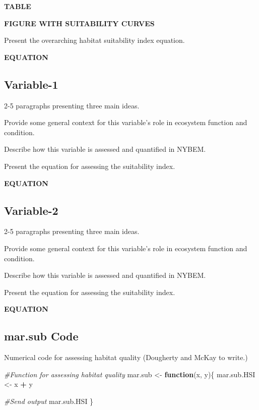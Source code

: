 \documentclass[
]{book}
\newenvironment{Shaded}{\begin{snugshade}}{\end{snugshade}}
\newcommand{\CommentTok}[1]{\textcolor[rgb]{0.56,0.35,0.01}{\textit{#1}}}
\newcommand{\ControlFlowTok}[1]{\textcolor[rgb]{0.13,0.29,0.53}{\textbf{#1}}}
\newcommand{\NormalTok}[1]{#1}
\newcommand{\OperatorTok}[1]{\textcolor[rgb]{0.81,0.36,0.00}{\textbf{#1}}}
\newcommand{\StringTok}[1]{\textcolor[rgb]{0.31,0.60,0.02}{#1}}
\begin{document}
\textbf{TABLE}

\textbf{FIGURE WITH SUITABILITY CURVES}

Present the overarching habitat suitability index equation.

\textbf{EQUATION}

\hypertarget{variable-1-5}{%
\subsection{Variable-1}\label{variable-1-5}}

2-5 paragraphs presenting three main ideas.

Provide some general context for this variable's role in ecosystem function and condition.

Describe how this variable is assessed and quantified in NYBEM.

Present the equation for assessing the suitability index.

\textbf{EQUATION}

\hypertarget{variable-2-3}{%
\subsection{Variable-2}\label{variable-2-3}}

2-5 paragraphs presenting three main ideas.

Provide some general context for this variable's role in ecosystem function and condition.

Describe how this variable is assessed and quantified in NYBEM.

Present the equation for assessing the suitability index.

\textbf{EQUATION}

\hypertarget{mar.sub-code}{%
\subsection{mar.sub Code}\label{mar.sub-code}}

Numerical code for assessing habitat quality ({Dougherty and McKay to write.})

\begin{Shaded}
\begin{Highlighting}[]
\CommentTok{#Function for assessing habitat quality}
\NormalTok{mar.sub <-}\StringTok{ }\ControlFlowTok{function}\NormalTok{(x, y)\{}
\NormalTok{  mar.sub.HSI <-}\StringTok{ }\NormalTok{x }\OperatorTok{+}\StringTok{ }\NormalTok{y}

  \CommentTok{#Send output}
\NormalTok{  mar.sub.HSI}
\NormalTok{\}}
\end{Highlighting}
\end{Shaded}
\end{document}
